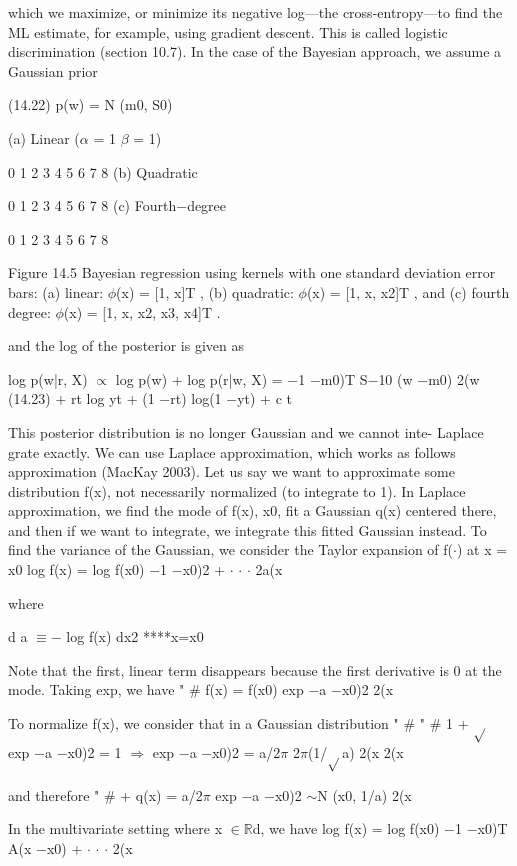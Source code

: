 which we maximize, or minimize its negative log---the cross-entropy---to find the ML estimate, for example, using gradient descent. This is called logistic discrimination (section 10.7). In the case of the Bayesian approach, we assume a Gaussian prior

(14.22) p(w) = N (m0, S0)

(a) Linear ($\alpha$ = 1 $\beta$ = 1)

0 1 2 3 4 5 6 7 8 (b) Quadratic

0 1 2 3 4 5 6 7 8 (c) Fourth$-$degree

0 1 2 3 4 5 6 7 8

Figure 14.5 Bayesian regression using kernels with one standard deviation error bars: (a) linear: $\phi$(x) = [1, x]T , (b) quadratic: $\phi$(x) = [1, x, x2]T , and (c) fourth degree: $\phi$(x) = [1, x, x2, x3, x4]T .

and the log of the posterior is given as

log p(w|r, X) $\propto$ log p(w) + log p(r|w, X) = $-$1 $-$m0)T S$-$10 (w $-$m0) 2(w (14.23) + rt log yt + (1 $-$rt) log(1 $-$yt) + c t

This posterior distribution is no longer Gaussian and we cannot inte- Laplace grate exactly. We can use Laplace approximation, which works as follows approximation (MacKay 2003). Let us say we want to approximate some distribution f(x), not necessarily normalized (to integrate to 1). In Laplace approximation, we find the mode of f(x), x0, fit a Gaussian q(x) centered there, and then if we want to integrate, we integrate this fitted Gaussian instead. To find the variance of the Gaussian, we consider the Taylor expansion of f($\cdot$) at x = x0 log f(x) = log f(x0) $-$1 $-$x0)2 + $\cdot$ $\cdot$ $\cdot$ 2a(x

where

d a $\equiv$$-$ log f(x) dx2 ****x=x0

Note that the first, linear term disappears because the first derivative is 0 at the mode. Taking exp, we have " \# f(x) = f(x0) exp $-$a $-$x0)2 2(x

To normalize f(x), we consider that in a Gaussian distribution " \# " \# 1 + $\sqrt{}$ exp $-$a $-$x0)2 = 1 $\Rightarrow$ exp $-$a $-$x0)2 = a/2$\pi$ 2$\pi$(1/$\sqrt{}$a) 2(x 2(x

and therefore " \# + q(x) = a/2$\pi$ exp $-$a $-$x0)2 $\sim$N (x0, 1/a) 2(x

In the multivariate setting where x $\in$$\mathbb{R}$d, we have log f(x) = log f(x0) $-$1 $-$x0)T A(x $-$x0) + $\cdot$ $\cdot$ $\cdot$ 2(x


